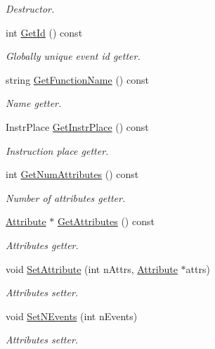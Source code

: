 \begin{DoxyCompactItemize}
\begin{DoxyCompactList}\small\item\em Destructor. \end{DoxyCompactList}\item 
int \hyperlink{class_model_1_1_event_ac7b7d9607b8ea5c1ac0300120ad05807}{Get\-Id} () const 
\begin{DoxyCompactList}\small\item\em Globally unique event id getter. \end{DoxyCompactList}\item 
string \hyperlink{class_model_1_1_event_a341b241b108db5bda1f388a2d3379047}{Get\-Function\-Name} () const 
\begin{DoxyCompactList}\small\item\em Name getter. \end{DoxyCompactList}\item 
Instr\-Place \hyperlink{class_model_1_1_event_ab94faa4d80aac8a3bb0e580944fcc023}{Get\-Instr\-Place} () const 
\begin{DoxyCompactList}\small\item\em Instruction place getter. \end{DoxyCompactList}\item 
int \hyperlink{class_model_1_1_event_a01daa5713432336487fce34d87fd1cc9}{Get\-Num\-Attributes} () const 
\begin{DoxyCompactList}\small\item\em Number of attributes getter. \end{DoxyCompactList}\item 
\hyperlink{class_common_1_1_attribute}{Attribute} $\ast$ \hyperlink{class_model_1_1_event_a90a9468086e076656f1bc910dbcb7a3f}{Get\-Attributes} () const 
\begin{DoxyCompactList}\small\item\em Attributes getter. \end{DoxyCompactList}\item 
void \hyperlink{class_model_1_1_event_a22ee34f5b6028817a1b3175799c64ec2}{Set\-Attribute} (int n\-Attrs, \hyperlink{class_common_1_1_attribute}{Attribute} $\ast$attrs)
\begin{DoxyCompactList}\small\item\em Attributes setter. \end{DoxyCompactList}\item 
void \hyperlink{class_model_1_1_event_a9ff45caab649bc7dda897385e715596f}{Set\-N\-Events} (int n\-Events)
\begin{DoxyCompactList}\small\item\em Attributes setter. \end{DoxyCompactList}\item 

\end{DoxyCompactItemize}
